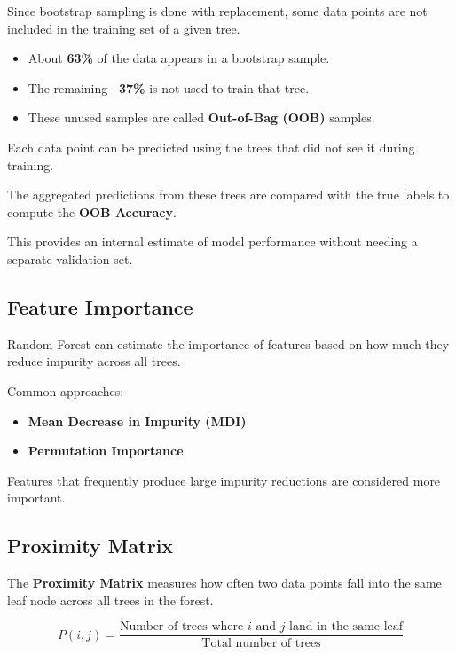 \documentclass[10pt,a4paper]{article}
\begin{document}
		Since bootstrap sampling is done with replacement, some data points are not included in the training set of a given tree.
	
		\begin{itemize}
			\item About \textbf{63\%} of the data appears in a bootstrap sample.
			\item The remaining \textbf{~37\%} is not used to train that tree.
			\item These unused samples are called \textbf{Out-of-Bag (OOB)} samples.
		\end{itemize}
	
		Each data point can be predicted using the trees that did not see it during training.
	
		The aggregated predictions from these trees are compared with the true labels to compute the \textbf{OOB Accuracy}.
	
		This provides an internal estimate of model performance without needing a separate validation set.
	
		\subsection{Feature Importance}
	
		Random Forest can estimate the importance of features based on how much they reduce impurity across all trees.
	
		Common approaches:
	
		\begin{itemize}
			\item \textbf{Mean Decrease in Impurity (MDI)}
			\item \textbf{Permutation Importance}
		\end{itemize}
	
		Features that frequently produce large impurity reductions are considered more important.
	
		\subsection{Proximity Matrix}
	
		The \textbf{Proximity Matrix} measures how often two data points fall into the same leaf node across all trees in the forest.
	
	
			\[
			P(i,j) =
			\frac{\text{Number of trees where } i \text{ and } j \text{ land in the same leaf}}
			{\text{Total number of trees}}
			\]
	
\end{document}
